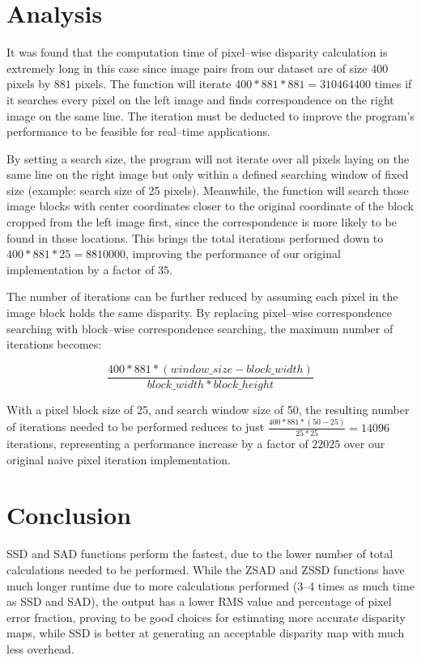 \documentclass[conference]{IEEEtran}
\begin{document}
\section{Analysis}

It was found that the computation time of pixel--wise disparity calculation is extremely long in this case since image pairs from our dataset are of size $400$ pixels by $881$ pixels. The function will iterate $400*881*881=310464400$ times if it searches every pixel on the left image and finds correspondence on the right image on the same line. The iteration must be deducted to improve the program's performance to be feasible for real--time applications.

By setting a search size, the program will not iterate over all pixels laying on the same line on the right image but only within a defined searching window of fixed size (example: search size of 25 pixels). Meanwhile, the function will search those image blocks with center coordinates closer to the original coordinate of the block cropped from the left image first, since the correspondence is more likely to be found in those locations. This brings the total iterations performed down to $400*881*25=8810000$, improving the performance of our original implementation by a factor of $35$.

The number of iterations can be further reduced by assuming each pixel in the image block holds the same disparity. By replacing pixel--wise correspondence searching with block--wise correspondence searching, the maximum number of iterations becomes:

\begin{equation*}
    \frac{400*881*(window\_size-block\_width)}{block\_width*block\_height}
\end{equation*}

With a pixel block size of 25, and search window size of 50, the resulting number of iterations needed to be performed reduces to just $\frac{400*881*(50-25)}{25*25}=14096$ iterations, representing a performance increase by a factor of $22025$ over our original naive pixel iteration implementation.

\vspace{4pt}
\section{Conclusion}

SSD and SAD functions perform the fastest, due to the lower number of total calculations needed to be performed. While the ZSAD and ZSSD functions have much longer runtime due to more calculations performed (3--4 times as much time as SSD and SAD), the output has a lower RMS value and percentage of pixel error fraction, proving to be good choices for estimating more accurate disparity maps, while SSD is better at generating an acceptable disparity map with much less overhead. 
\end{document}
